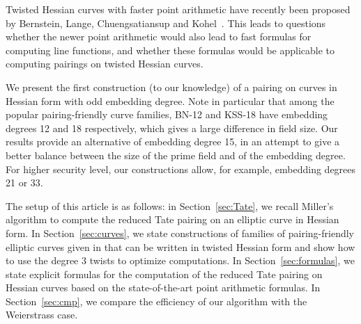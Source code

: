 Twisted Hessian curves with faster point arithmetic have recently been proposed by
Bernstein, Lange, Chuengsatiansup and Kohel~\cite{2015/hessian}.
This leads to questions whether the newer point arithmetic would also lead to fast formulas for computing line functions,
and whether these formulas would be applicable to computing pairings on twisted Hessian curves.

We present the first construction (to our knowledge) of a pairing on curves in Hessian form with odd embedding degree. Note in particular that among the popular pairing-friendly curve families,
BN-12 and KSS-18 have embedding degrees 12 and 18 respectively, which gives a large difference in field size. Our results provide an alternative of embedding degree 15, in an attempt to give a better balance between the size of the prime field and of the embedding degree. For higher security level, our constructions allow, for example, embedding degrees 21 or 33.

The setup of this article is as follows:
in Section~\ref{sec:Tate}, we recall Miller's algorithm to compute the reduced Tate pairing on an elliptic curve in Hessian form.
In Section~\ref{sec:curves}, we state constructions of families of pairing-friendly elliptic curves given in \cite{2010/freeman} that can be written in twisted Hessian form and show how to use the degree 3 twists to optimize computations.
In Section~\ref{sec:formulas}, we state explicit formulas for the computation of the reduced Tate pairing on Hessian curves based on the state-of-the-art point arithmetic formulas.
In Section~\ref{sec:cmp}, we compare the efficiency of our algorithm with the Weierstrass case.


